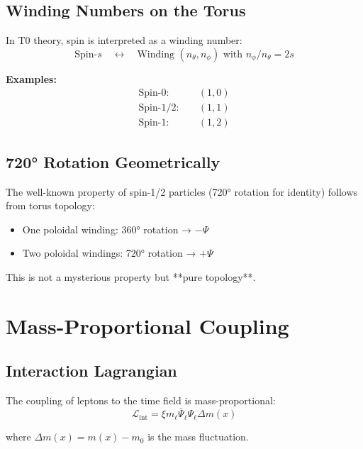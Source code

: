 	\subsection{Winding Numbers on the Torus}
	
	In T0 theory, spin is interpreted as a winding number:
	\begin{equation}
		\text{Spin-}s \quad \longleftrightarrow \quad 
		\text{Winding } (n_\theta, n_\phi) \text{ with } n_\phi/n_\theta = 2s
		\label{eq:spin_topology}
	\end{equation}
	
	\textbf{Examples:}
	\begin{align}
		\text{Spin-}0: &\quad (1, 0) \\
		\text{Spin-}1/2: &\quad (1, 1) \\
		\text{Spin-}1: &\quad (1, 2)
	\end{align}
	
	\subsection{720° Rotation Geometrically}
	
	The well-known property of spin-1/2 particles (720° rotation for identity) follows from torus topology:
	
	\begin{itemize}
		\item One poloidal winding: 360° rotation → $-\Psi$
		\item Two poloidal windings: 720° rotation → $+\Psi$
	\end{itemize}
	
	This is not a mysterious property but **pure topology**.
	
	\section{Mass-Proportional Coupling}
	
	\subsection{Interaction Lagrangian}
	
	The coupling of leptons to the time field is mass-proportional:
	\begin{equation}
		\mathcal{L}_{\text{int}} = \xi m_\ell \bar{\Psi}_\ell \Psi_\ell \Delta m(x)
		\label{eq:mass_proportional}
	\end{equation}
	
	where $\Delta m(x) = m(x) - m_0$ is the mass fluctuation.
	
